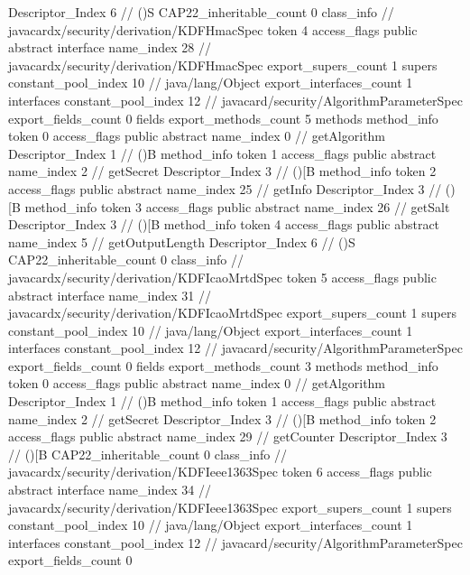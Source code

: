 {{{{{					Descriptor_Index	6		// ()S
				}
			}
			CAP22_inheritable_count	0
		}
		class_info {		// javacardx/security/derivation/KDFHmacSpec
			token	4
			access_flags	public abstract interface
			name_index	28		// javacardx/security/derivation/KDFHmacSpec
			export_supers_count	1
			supers {
				constant_pool_index	10		// java/lang/Object
			}
			export_interfaces_count	1
			interfaces {
				constant_pool_index	12		// javacard/security/AlgorithmParameterSpec
			}
			export_fields_count	0
			fields {
			}
			export_methods_count	5
			methods {
				method_info {
					token	0
					access_flags	public abstract
					name_index	0		// getAlgorithm
					Descriptor_Index	1		// ()B
				}
				method_info {
					token	1
					access_flags	public abstract
					name_index	2		// getSecret
					Descriptor_Index	3		// ()[B
				}
				method_info {
					token	2
					access_flags	public abstract
					name_index	25		// getInfo
					Descriptor_Index	3		// ()[B
				}
				method_info {
					token	3
					access_flags	public abstract
					name_index	26		// getSalt
					Descriptor_Index	3		// ()[B
				}
				method_info {
					token	4
					access_flags	public abstract
					name_index	5		// getOutputLength
					Descriptor_Index	6		// ()S
				}
			}
			CAP22_inheritable_count	0
		}
		class_info {		// javacardx/security/derivation/KDFIcaoMrtdSpec
			token	5
			access_flags	public abstract interface
			name_index	31		// javacardx/security/derivation/KDFIcaoMrtdSpec
			export_supers_count	1
			supers {
				constant_pool_index	10		// java/lang/Object
			}
			export_interfaces_count	1
			interfaces {
				constant_pool_index	12		// javacard/security/AlgorithmParameterSpec
			}
			export_fields_count	0
			fields {
			}
			export_methods_count	3
			methods {
				method_info {
					token	0
					access_flags	public abstract
					name_index	0		// getAlgorithm
					Descriptor_Index	1		// ()B
				}
				method_info {
					token	1
					access_flags	public abstract
					name_index	2		// getSecret
					Descriptor_Index	3		// ()[B
				}
				method_info {
					token	2
					access_flags	public abstract
					name_index	29		// getCounter
					Descriptor_Index	3		// ()[B
				}
			}
			CAP22_inheritable_count	0
		}
		class_info {		// javacardx/security/derivation/KDFIeee1363Spec
			token	6
			access_flags	public abstract interface
			name_index	34		// javacardx/security/derivation/KDFIeee1363Spec
			export_supers_count	1
			supers {
				constant_pool_index	10		// java/lang/Object
			}
			export_interfaces_count	1
			interfaces {
				constant_pool_index	12		// javacard/security/AlgorithmParameterSpec
			}
			export_fields_count	0
}}}
